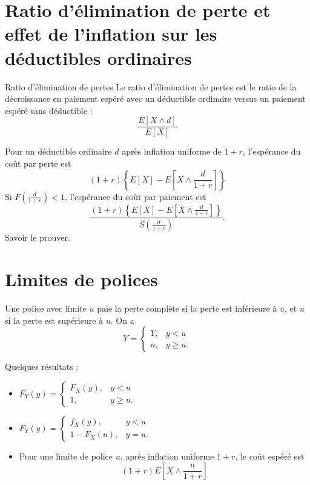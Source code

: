 \section{Ratio d'élimination de perte et effet de l'inflation sur les déductibles ordinaires}

\begin{definition}{Ratio d'élimination de pertes}{}
	Le ratio d'élimination de pertes est le ratio de la décroissance en paiement espéré avec un déductible ordinaire versus un paiement espéré sans déductible : 
	$$\frac{E[X\wedge d]}{E[X]}$$
\end{definition}

\begin{theoreme}{}{}
	Pour un déductible ordinaire $d$ après inflation uniforme de $1 + r$, l'espérance du coût par perte est
	$$(1 + r) \left\{E[X] - E\left[X \wedge \frac{d}{1 + r}\right]\right\}$$
	\tcblower
	Si $F\left(\frac{d}{1+r}\right) < 1$, l'espérance du coût par paiement est 
	$$\frac{(1 + r) \left\{E[X] - E\left[X \wedge \frac{d}{1 + r}\right]\right\}}{S\left(\frac{d}{1 + r}\right)}.$$
	Savoir le prouver. 
\end{theoreme}

\section{Limites de polices}

\begin{definition}{}{}
	Une police avec limite $u$ paie la perte complète si la perte est inférieure à $u$, et $u$ si la perte est supérieure à $u$. On a 
	$$Y = \begin{cases}
	Y,& y<u\\
	u,& y\geq u.
	\end{cases}$$
\end{definition}

Quelques résultats : 

\begin{itemize}
	\item $\displaystyle F_{Y}(y) = \begin{cases}
	F_{X}(y),& y < u\\
	1,& y\geq u.
	\end{cases}$
	\item $\displaystyle F_{Y}(y) = \begin{cases}
	f_{X}(y),& y < u\\
	1-F_{X}(u),& y = u.
	\end{cases}$
	\item Pour une limite de police $u$, après inflation uniforme $1 + r$, le coût espéré est
	$$(1 + r)E\left[X \wedge \frac{u}{1 + r}\right]$$
\end{itemize}

